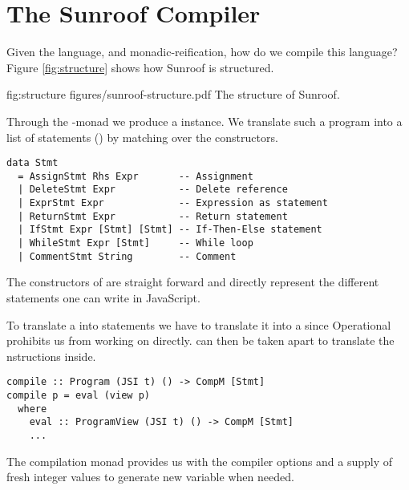  
\section{The Sunroof Compiler}
\label{sec:compiler}

Given the language, and monadic-reification, how do we compile this language?
Figure \ref{fig:structure} shows how Sunroof is structured.

\Figure%
{fig:structure}%
{figures/sunroof-structure.pdf}%
{The structure of Sunroof.}

Through the \JS-monad we produce a  instance. We 
translate such a program into a list of statements () by matching over 
the \JSI constructors.
\begin{verbatim}
data Stmt 
  = AssignStmt Rhs Expr       -- Assignment
  | DeleteStmt Expr           -- Delete reference
  | ExprStmt Expr             -- Expression as statement
  | ReturnStmt Expr           -- Return statement
  | IfStmt Expr [Stmt] [Stmt] -- If-Then-Else statement
  | WhileStmt Expr [Stmt]     -- While loop
  | CommentStmt String        -- Comment
\end{verbatim}
The constructors of  are straight forward and
directly represent the different statements one can write
in JavaScript.

To translate a  into statements we
have to translate it into a  since 
Operational prohibits us from working on  directly.
 can then be taken apart to translate 
the \JSI nstructions inside.
\begin{verbatim}
compile :: Program (JSI t) () -> CompM [Stmt]
compile p = eval (view p)
  where
    eval :: ProgramView (JSI t) () -> CompM [Stmt]
    ...
\end{verbatim}
The compilation monad  provides us with 
the compiler options and a supply of fresh integer
values to generate new variable when needed.

